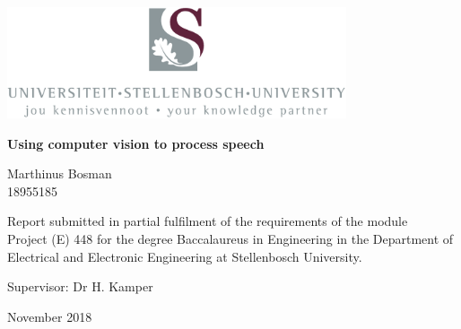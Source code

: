 \graphicspath{{frontmatter/fig/}}

\begin{titlepage}
\begin{center}

\includegraphics[width=10cm]{USlogo-top}

\vfill

{\rmfamily \bfseries \huge Using computer vision to process speech \par}

\vfill

{\large {\Large Marthinus Bosman} \\ 18955185 \par}

\vfill

\vfill

{Report submitted in partial fulfilment of the requirements of the module \\
Project (E) 448 for the degree Baccalaureus in Engineering in the Department of
Electrical and Electronic Engineering at Stellenbosch University. \par}

\vfill

{\large {Supervisor}: Dr H. Kamper} %

\vfill

{\Large November 2018}
\end{center}
\end{titlepage}
